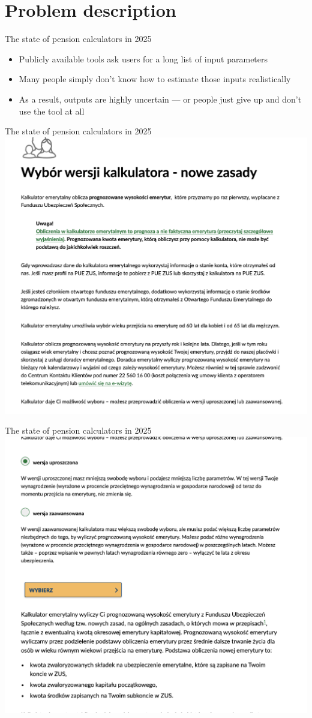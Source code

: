 \section{Problem description}

\begin{frame}[t]{The state of pension calculators in 2025}
\begin{itemize}
  \item Publicly available tools ask users for a long list of input parameters
  \pause
  \item Many people simply don’t know how to estimate those inputs realistically
  \pause
  \item As a result, outputs are highly uncertain --- or people just give up
  and don’t use the tool at all
\end{itemize}
\end{frame}

\begin{frame}[t]{The state of pension calculators in 2025}
\includegraphics[width=.8\textwidth]{img/zus_calculator_01}
\end{frame}

\begin{frame}[t]{The state of pension calculators in 2025}
\includegraphics[width=.8\textwidth]{img/zus_calculator_02}
\end{frame}

